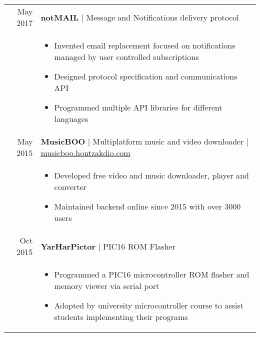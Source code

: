 \documentclass[a4paper,10pt]{article}
\begin{document}
\begin{tabular}{rp{14.85cm}}
 May 2017 & \textbf{notMAIL} | Message and Notifications delivery protocol \\
 & \footnotesize{ \begin{itemize}[noitemsep,topsep=3pt]
 \vspace{-0.1in}
 \item Invented email replacement focused on notifications managed by user controlled subscriptions
 \item Designed protocol specification and communications API
 \item Programmed multiple API libraries for different languages
 \end{itemize}} \vspace{-0.1in} \\ 

 May 2015 & \textbf{MusicBOO} | Multiplatform music and video downloader \href{http://musicboo.hontzakdio.com/}{\hfill | \footnotesize musicboo.hontzakdio.com}\\
 & \footnotesize{ \begin{itemize}[noitemsep,topsep=3pt]
 \vspace{-0.1in}
 \item Developed free video and music downloader, player and converter
 \item Maintained backend online since 2015 with over 3000 users
 \end{itemize}} \vspace{-0.1in} \\ 

 Oct 2015 & \textbf{YarHarPictor} | PIC16 ROM Flasher \\
 & \footnotesize{ \begin{itemize}[noitemsep,topsep=3pt]
 \vspace{-0.1in}
 \item Programmed a PIC16 microcontroller ROM flasher and memory viewer via serial port
 \item Adopted by university microcontroller course to assist students implementing their programs
 \end{itemize}} \vspace{-0.1in} \\ 




\end{tabular}
\end{document}
